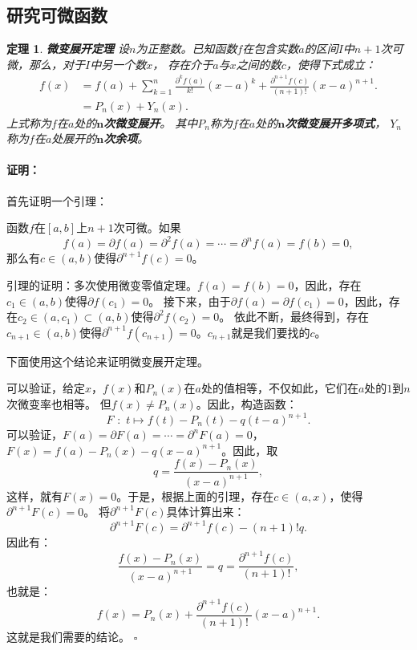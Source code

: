 \documentclass[12pt,UTF8]{ctexbook}
\renewenvironment{proof}{\paragraph{\textbf{证明：}}}{\hfill$\square$}
\newtheorem{tm}{定理}[section]
\begin{document}
\begin{appendix}
\section{研究可微函数}

\begin{tm}{\textbf{微变展开定理}}
    设$n$为正整数。已知函数$f$在包含实数$a$的区间$I$中$n+1$次可微，那么，对于$I$中另一个数$x$，
    存在介于$a$与$x$之间的数$c$，使得下式成立：
    \begin{align*}
        f(x) &= f(a) + \sum_{k=1}^n \frac{\partial^k f (a)}{k!}(x - a)^k + \frac{\partial^{n+1} f (c)}{(n+1)!}(x - a)^{n+1}.  \\
        &= P_n(x) + Y_n(x). 
    \end{align*}
    上式称为$f$在$a$处的$\boldsymbol{n}$\textbf{次微变展开}。
    其中$P_n$称为$f$在$a$处的$\boldsymbol{n}$\textbf{次微变展开多项式}，
    $Y_n$称为$f$在$a$处展开的$\boldsymbol{n}$\textbf{次余项}。
    
\end{tm}

\begin{proof}
    首先证明一个引理：

    函数$f$在$[a, b]$上$n+1$次可微。如果
    $$f(a) = \partial f(a) = \partial^2 f(a) = \cdots = \partial^{n} f(a) = f(b) = 0,$$
    那么有$c\in(a, b)$使得$\partial^{n+1} f(c) = 0$。

    引理的证明：多次使用微变零值定理。$f(a) = f(b) = 0$，因此，存在$c_1\in(a, b)$使得$\partial f (c_1) = 0$。
    接下来，由于$\partial f(a) = \partial f(c_1) = 0$，因此，存在$c_2\in(a, c_1)\subset(a, b)$使得$\partial^2 f (c_2) = 0$。
    依此不断，最终得到，存在$c_{n+1}\in(a, b)$使得$\partial^{n+1} f (c_{n+1}) = 0$。$c_{n+1}$就是我们要找的$c$。

    下面使用这个结论来证明微变展开定理。

    可以验证，给定$x$，$f(x)$和$P_n(x)$在$a$处的值相等，不仅如此，它们在$a$处的$1$到$n$次微变率也相等。
    但$f(x) \neq P_n(x)$。因此，构造函数：
    $$ F\,\,: \,\, t \mapsto f(t) - P_n(t) - q(t - a)^{n+1}. $$
    可以验证，$F(a) = \partial F(a) = \cdots = \partial^n F(a) = 0$，
    $F(x) = f(a) - P_n(x) - q(x - a)^{n+1}$。因此，取
    $$ q = \frac{f(x) - P_n(x)}{(x - a)^{n+1}}, $$
    这样，就有$F(x) = 0$。于是，根据上面的引理，存在$c\in(a, x)$，使得$\partial^{n+1} F(c) = 0$。
    将$\partial^{n+1} F(c)$具体计算出来：
    $$ \partial^{n+1} F(c) = \partial^{n+1} f(c) - (n+1)! q.$$
    因此有：
    $$ \frac{f(x) - P_n(x)}{(x - a)^{n+1}} = q = \frac{\partial^{n+1} f(c)}{(n+1)!}, $$
    也就是：
    $$ f(x) = P_n(x) + \frac{\partial^{n+1} f(c)}{(n+1)!} (x - a)^{n+1}. $$
    这就是我们需要的结论。
\end{proof}


\end{appendix}
\end{document}
